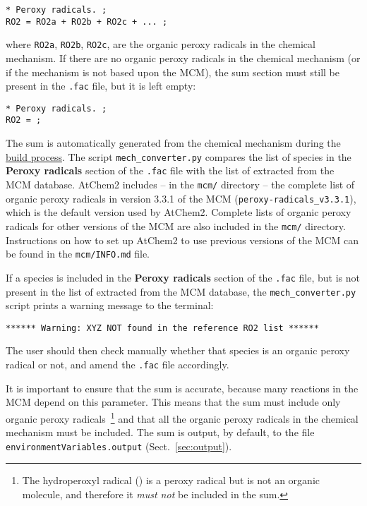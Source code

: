 \begin{verbatim}
* Peroxy radicals. ;
RO2 = RO2a + RO2b + RO2c + ... ;
\end{verbatim}

where \texttt{RO2a}, \texttt{RO2b}, \texttt{RO2c}, are the organic
peroxy radicals in the chemical mechanism. If there are no organic
peroxy radicals in the chemical mechanism (or if the mechanism is not
based upon the MCM), the  sum section must still be present in
the \texttt{.fac} file, but it is left empty:

\begin{verbatim}
* Peroxy radicals. ;
RO2 = ;
\end{verbatim}

The  sum is automatically generated from the chemical
mechanism during the \hyperref[subsec:build-process]{build process}.
The script \texttt{mech\_converter.py} compares the list of species in
the \textbf{Peroxy radicals} section of the \texttt{.fac} file with the
list of  extracted from the MCM database. AtChem2 includes --
in the \texttt{mcm/} directory -- the complete list of organic peroxy
radicals in version 3.3.1 of the MCM (\texttt{peroxy-radicals\_v3.3.1}),
which is the default version used by AtChem2. Complete lists of
organic peroxy radicals for other versions of the MCM are also
included in the \texttt{mcm/} directory. Instructions on how to set up
AtChem2 to use previous versions of the MCM can be found in the
\texttt{mcm/INFO.md} file.

If a species is included in the \textbf{Peroxy radicals} section of the
\texttt{.fac} file, but is not present in the list of 
extracted from the MCM database, the \texttt{mech\_converter.py}
script prints a warning message to the terminal:

\begin{verbatim}
****** Warning: XYZ NOT found in the reference RO2 list ******
\end{verbatim}

The user should then check manually whether that species is an organic
peroxy radical or not, and amend the \texttt{.fac} file accordingly.

It is important to ensure that the  sum is accurate, because
many reactions in the MCM depend on this parameter. This means that
the  sum must include only organic peroxy
radicals~\footnote{The hydroperoxyl radical () is a peroxy
  radical but is not an organic molecule, and therefore it
  \emph{must not} be included in the  sum.} and that all
the organic peroxy radicals in the chemical mechanism must be
included. The  sum is output, by default, to the file
\texttt{environmentVariables.output} (Sect.~\ref{sec:output}).

